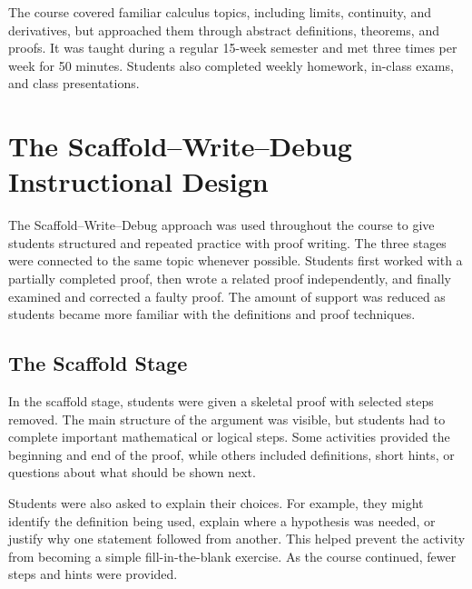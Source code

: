 \documentclass[12pt]{article}
\begin{document}
The course covered familiar calculus topics, including limits, continuity, and derivatives, but approached them through abstract definitions, theorems, and proofs. It was taught during a regular 15-week semester and met three times per week for 50 minutes. Students also completed weekly homework, in-class exams, and class presentations.

\section{The Scaffold--Write--Debug Instructional Design}

The Scaffold--Write--Debug approach was used throughout the course to give students structured and repeated practice with proof writing. The three stages were connected to the same topic whenever possible. Students first worked with a partially completed proof, then wrote a related proof independently, and finally examined and corrected a faulty proof. The amount of support was reduced as students became more familiar with the definitions and proof techniques.

\subsection{The Scaffold Stage}

In the scaffold stage, students were given a skeletal proof with selected steps removed. The main structure of the argument was visible, but students had to complete important mathematical or logical steps. Some activities provided the beginning and end of the proof, while others included definitions, short hints, or questions about what should be shown next.

Students were also asked to explain their choices. For example, they might identify the definition being used, explain where a hypothesis was needed, or justify why one statement followed from another. This helped prevent the activity from becoming a simple fill-in-the-blank exercise. As the course continued, fewer steps and hints were provided.\\
\end{document}
